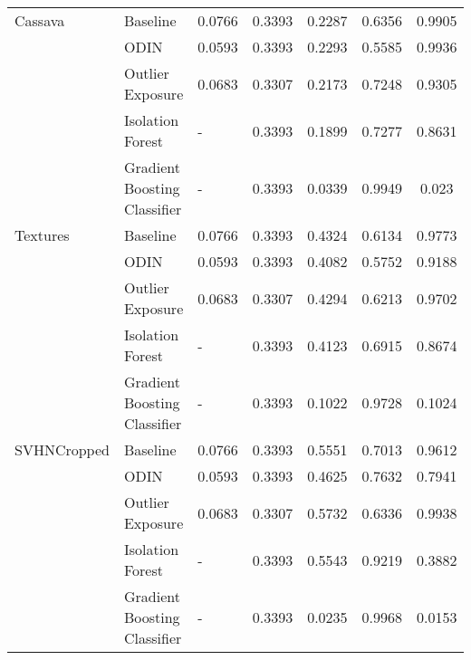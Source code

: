 \documentclass{article}
\begin{document}
\begin{table}[h]
\begin{tabular}{lllHccc}
\midrule
Cassava & Baseline &        0.0766 &               0.3393 &    0.2287 &  0.6356 &         0.9905 \\
            & ODIN &        0.0593 &               0.3393 &    0.2293 &  0.5585 &         0.9936 \\
            & Outlier Exposure &        0.0683 &               0.3307 &    0.2173 &  0.7248 &         0.9305 \\
            & Isolation Forest &             - &               0.3393 &    0.1899 &  0.7277 &         0.8631 \\
            & Gradient Boosting Classifier &             - &               0.3393 &    0.0339 &  0.9949 &          0.023 \\
\midrule
Textures & Baseline &        0.0766 &               0.3393 &    0.4324 &  0.6134 &         0.9773 \\
            & ODIN &        0.0593 &               0.3393 &    0.4082 &  0.5752 &         0.9188 \\
            & Outlier Exposure &        0.0683 &               0.3307 &    0.4294 &  0.6213 &         0.9702 \\
            & Isolation Forest &             - &               0.3393 &    0.4123 &  0.6915 &         0.8674 \\
            & Gradient Boosting Classifier &             - &               0.3393 &    0.1022 &  0.9728 &         0.1024 \\
\midrule
SVHNCropped & Baseline &        0.0766 &               0.3393 &    0.5551 &  0.7013 &         0.9612 \\
            & ODIN &        0.0593 &               0.3393 &    0.4625 &  0.7632 &         0.7941 \\
            & Outlier Exposure &        0.0683 &               0.3307 &    0.5732 &  0.6336 &         0.9938 \\
            & Isolation Forest &             - &               0.3393 &    0.5543 &  0.9219 &         0.3882 \\
            & Gradient Boosting Classifier &             - &               0.3393 &    0.0235 &  0.9968 &         0.0153 \\
\bottomrule
\end{tabular}

\end{table}
\end{document}
